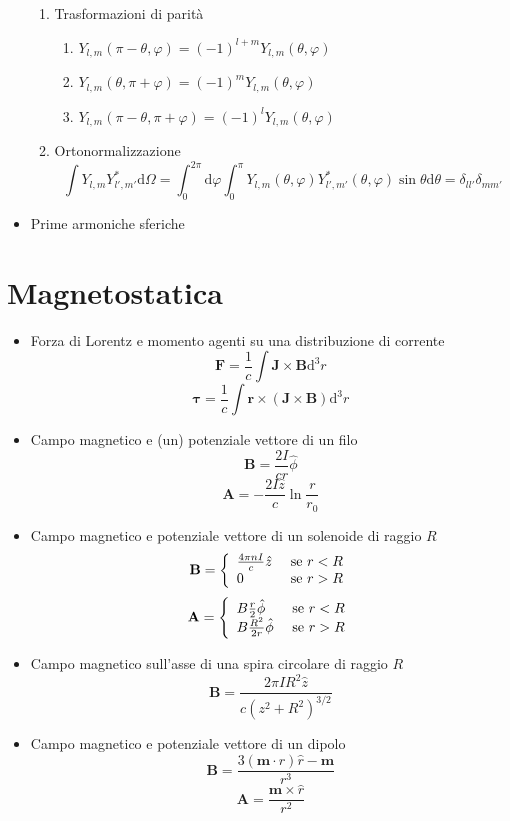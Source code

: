 \documentclass[a4paper,11pt]{book}
\newcommand{\dif}{\mathrm{d}}
\renewcommand{\vec}[1]{\mathbf{#1}}
\theoremstyle{theorem}
\theoremstyle{definition}
\begin{document}
\begin{itemize}
\begin{enumerate}
		\item Trasformazioni di parità
	\begin{enumerate}
		\item $Y_{l,m}(\pi-\theta,\varphi)=(-1)^{l+m}Y_{l,m}(\theta,\varphi)$
		\item $Y_{l,m}(\theta,\pi+\varphi)=(-1)^mY_{l,m}(\theta,\varphi)$
		\item $Y_{l,m}(\pi-\theta,\pi+\varphi)=(-1)^lY_{l,m}(\theta,\varphi)$
	\end{enumerate}
	\item Ortonormalizzazione
	\[\int Y_{l,m}Y^*_{l',m'}\dif\Omega=\int_{0}^{2\pi}\dif\varphi\int_{0}^{\pi}Y_{l,m}(\theta,\varphi)Y^*_{l',m'}(\theta,\varphi)\sin\theta\dif\theta=\delta_{ll'}\delta_{mm'}\]
	\end{enumerate}
	\item Prime armoniche sferiche
\end{itemize}
\section{Magnetostatica}
\begin{itemize}
	\item Forza di Lorentz e momento agenti su una distribuzione di corrente
	\[\vec{F}=\frac{1}{c}\int\vec{J}\times\vec{B}\dif^3r\]
	\[\vec{\tau}=\frac{1}{c}\int\vec{r}\times(\vec{J}\times\vec{B})\dif^3r\]
	\item Campo magnetico e (un) potenziale vettore di un filo
	\[\vec{B}=\frac{2I}{cr}\hat{\phi}\]
	\[\vec{A}=-\frac{2I\hat{z}}{c}\ln\frac{r}{r_0}\]
	\item Campo magnetico e potenziale vettore di un solenoide di raggio $R$
	\[\vec{B}=\left\{\begin{array}{l l}
	\frac{4\pi nI}{c}\hat{z}&\textrm{ se }r<R\\
	0&\textrm{ se }r>R
	\end{array}\right.\]
	\[\vec{A}=\left\{\begin{array}{l l}
	B\frac{r}{2}\hat{\phi}&\textrm{ se }r<R\\
	B\frac{R^2}{2r}\hat{\phi}&\textrm{ se }r>R
	\end{array}\right.\]
	\item Campo magnetico sull'asse di una spira circolare di raggio $R$
	\[\vec{B}=\frac{2\pi IR^2\hat{z}}{c(z^2+R^2)^{3/2}}\]
	\item Campo magnetico e potenziale vettore di un dipolo
	\[\vec{B}=\frac{3(\vec{m}\cdot\hat{r})\hat{r}-\vec{m}}{r^3}\]
	\[\vec{A}=\frac{\vec{m}\times\hat{r}}{r^2}\]
\end{itemize}
\end{document}
